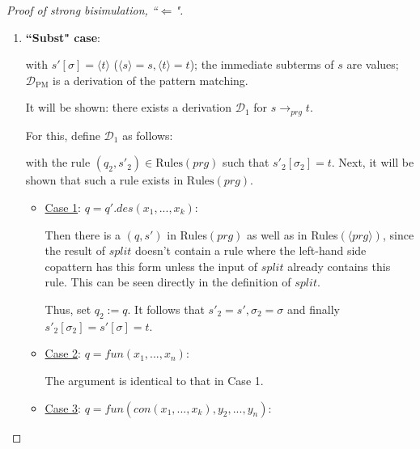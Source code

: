 \documentclass[11pt]{article} %
\begin{document}
\begin{proof}[Proof of strong bisimulation, ``$\Leftarrow$"] ~

\begin{enumerate}
\item \textbf{``Subst" case}:

\begin{prooftree}
\end{prooftree}

with $s'[\sigma] = \langle t \rangle$ ($\langle s \rangle = s, \langle t \rangle = t$); the immediate subterms of $s$ are values; $\mathcal{D}_{\textrm{PM}}$ is a derivation of the pattern matching.

It will be shown: there exists a derivation $\mathcal{D}_1$ for $s \longrightarrow_{prg} t$.

For this, define $\mathcal{D}_1$ as follows:

\begin{prooftree}
\end{prooftree}

with the rule $(q_2, s'_2) \in \textrm{Rules}(prg)$ such that $s'_2[\sigma_2] = t$. Next, it will be shown that such a rule exists in $\textrm{Rules}(prg)$.

\begin{itemize}
\item \underline{Case 1}: $q = q'.des(x_1, ..., x_k)$:

Then there is a $(q, s')$ in Rules$(prg)$ as well as in Rules$(\langle prg \rangle)$, since the result of $split$ doesn't contain a rule where the left-hand side copattern has this form unless the input of $split$ already contains this rule. This can be seen directly in the definition of $split$.

Thus, set $q_2 := q$. It follows that $s'_2 = s', \sigma_2 = \sigma$ and finally $s'_2[\sigma_2] = s'[\sigma] = t$.

\item \underline{Case 2}: $q = fun(x_1, ..., x_n)$:

The argument is identical to that in Case 1.

\item \underline{Case 3}: $q = fun(con(x_1, ..., x_k), y_2, ..., y_n)$:


\end{itemize}
\end{enumerate}
\end{proof}
\end{document}
